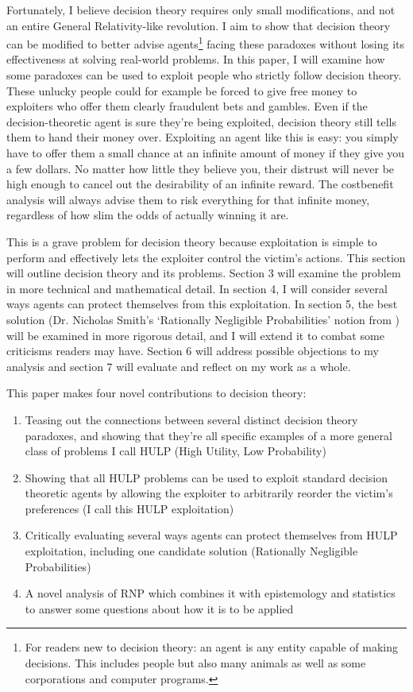 \documentclass{article}
\begin{document}
Fortunately, I believe decision theory requires only small modifications, and not an entire General Relativity-like revolution. I aim to show that decision theory can be modified to better advise agents\footnote{For readers new to decision theory: an agent is any entity capable of making decisions. This includes people but also many animals as well as some corporations and computer programs.} facing these paradoxes without losing its effectiveness at solving real-world problems. In this paper, I will examine how some paradoxes can be used to exploit people who strictly follow decision theory. These unlucky people could for example be forced to give free money to exploiters who offer them clearly fraudulent bets and gambles. Even if the decision-theoretic agent is sure they're being exploited, decision theory still tells them to hand their money over. Exploiting an agent like this is easy: you simply have to offer them a small chance at an infinite amount of money if they give you a few dollars. No matter how little they believe you, their distrust will never be high enough to cancel out the desirability of an infinite reward. The cost{\textemdash{}}benefit analysis will always advise them to risk everything for that infinite money, regardless of how slim the odds of actually winning it are.

This is a grave problem for decision theory because exploitation is simple to perform and effectively lets the exploiter control the victim's actions. This section will outline decision theory and its problems. Section 3 will examine the problem in more technical and mathematical detail. In section 4, I will consider several ways agents can protect themselves from this exploitation. In section 5, the best solution (Dr. Nicholas Smith's `Rationally Negligible Probabilities' notion from \citep{smith2014evaluative}) will be examined in more rigorous detail, and I will extend it to combat some criticisms readers may have. Section 6 will address possible objections to my analysis and section 7 will evaluate and reflect on my work as a whole.

This paper makes four novel contributions to decision theory:

\begin{enumerate}
\item Teasing out the connections between several distinct decision theory paradoxes, and showing that they're all specific examples of a more general class of problems I call HULP (High Utility, Low Probability)
\item Showing that all HULP problems can be used to exploit standard decision theoretic agents by allowing the exploiter to arbitrarily reorder the victim's preferences (I call this HULP exploitation)
\item Critically evaluating several ways agents can protect themselves from HULP exploitation, including one candidate solution (Rationally Negligible Probabilities)
\item A novel analysis of RNP which combines it with epistemology and statistics to answer some questions about how it is to be applied
\end{enumerate}
\end{document}
